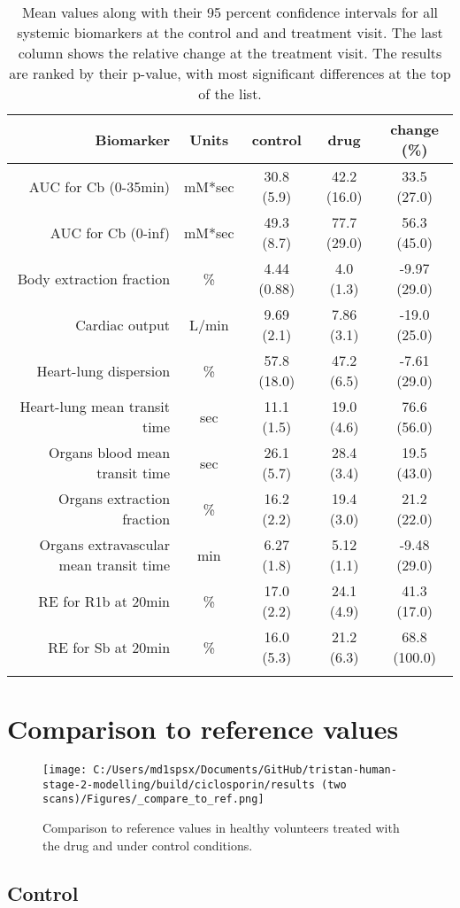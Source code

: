 \documentclass{epflreport}%
\begin{document}
\begin{longtable}{rcccc}%
\hline%
Biomarker&Units&control&drug&change (\%)\\%
\hline%
AUC for Cb (0{-}35min)&mM*sec&30.8 (5.9) &42.2 (16.0) &33.5 (27.0) \\%
AUC for Cb (0{-}inf)&mM*sec&49.3 (8.7) &77.7 (29.0) &56.3 (45.0) \\%
Body extraction fraction&\%&4.44 (0.88) &4.0 (1.3) &{-}9.97 (29.0) \\%
Cardiac output&L/min&9.69 (2.1) &7.86 (3.1) &{-}19.0 (25.0) \\%
Heart{-}lung dispersion&\%&57.8 (18.0) &47.2 (6.5) &{-}7.61 (29.0) \\%
Heart{-}lung mean transit time&sec&11.1 (1.5) &19.0 (4.6) &76.6 (56.0) \\%
Organs blood mean transit time&sec&26.1 (5.7) &28.4 (3.4) &19.5 (43.0) \\%
Organs extraction fraction&\%&16.2 (2.2) &19.4 (3.0) &21.2 (22.0) \\%
Organs extravascular mean transit time&min&6.27 (1.8) &5.12 (1.1) &{-}9.48 (29.0) \\%
RE for R1b at 20min&\%&17.0 (2.2) &24.1 (4.9) &41.3 (17.0) \\%
RE for Sb at 20min&\%&16.0 (5.3) &21.2 (6.3) &68.8 (100.0) \\%
\hline%
\caption{Mean values along with their 95 percent confidence intervals for all systemic biomarkers at the control and and treatment visit. The last column shows the relative change at the treatment visit. The results are ranked by their p-value, with most significant differences at the top of the list.} \\%
\end{longtable}%
\clearpage%
\section{Comparison to reference values}%
\label{sec:Comparisontoreferencevalues}%

%


\begin{figure}[h!]%
\centering%
\texttt{[image: C:/Users/md1spsx/Documents/GitHub/tristan-human-stage-2-modelling/build/ciclosporin/results (two scans)/Figures/\_compare\_to\_ref.png]}%
\caption{Comparison to reference values in healthy volunteers treated with the drug and under control conditions.}%
\end{figure}

%
\clearpage%
\subsection{Control}%
\label{subsec:Control}%
\end{document}
